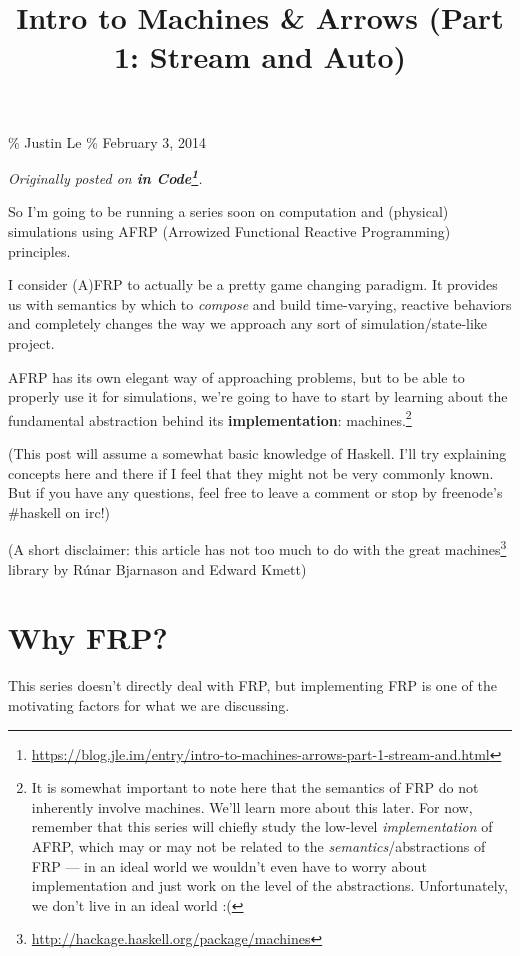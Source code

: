\documentclass[]{article}
\title{Intro to Machines \& Arrows (Part 1: Stream and Auto)}
\renewcommand{\href}[2]{#2\footnote{\url{#1}}}
\begin{document}
\maketitle

\% Justin Le \% February 3, 2014

\emph{Originally posted on
\textbf{\href{https://blog.jle.im/entry/intro-to-machines-arrows-part-1-stream-and.html}{in
Code}}.}

So I'm going to be running a series soon on computation and (physical)
simulations using AFRP (Arrowized Functional Reactive Programming) principles.

I consider (A)FRP to actually be a pretty game changing paradigm. It provides us
with semantics by which to \emph{compose} and build time-varying, reactive
behaviors and completely changes the way we approach any sort of
simulation/state-like project.

AFRP has its own elegant way of approaching problems, but to be able to properly
use it for simulations, we're going to have to start by learning about the
fundamental abstraction behind its \textbf{implementation}: machines.\footnote{It
  is somewhat important to note here that the semantics of FRP do not inherently
  involve machines. We'll learn more about this later. For now, remember that
  this series will chiefly study the low-level \emph{implementation} of AFRP,
  which may or may not be related to the \emph{semantics}/abstractions of FRP
  --- in an ideal world we wouldn't even have to worry about implementation and
  just work on the level of the abstractions. Unfortunately, we don't live in an
  ideal world :(}

(This post will assume a somewhat basic knowledge of Haskell. I'll try
explaining concepts here and there if I feel that they might not be very
commonly known. But if you have any questions, feel free to leave a comment or
stop by freenode's \#haskell on irc!)

(A short disclaimer: this article has not too much to do with the great
\href{http://hackage.haskell.org/package/machines}{machines} library by Rúnar
Bjarnason and Edward Kmett)

\section{Why FRP?}\label{why-frp}

This series doesn't directly deal with FRP, but implementing FRP is one of the
motivating factors for what we are discussing.
\end{document}
